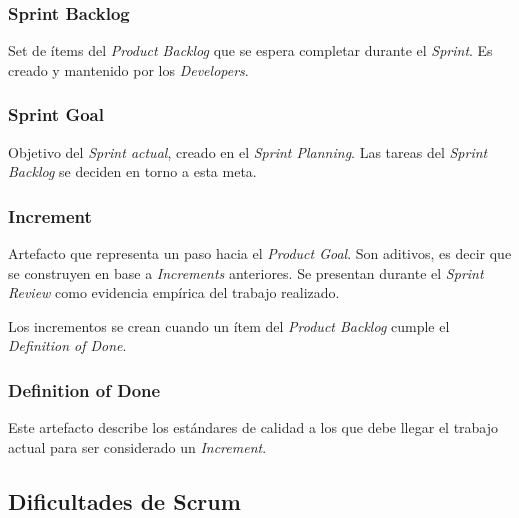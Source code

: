 \subsubsection{Sprint Backlog}
\par Set de ítems del \emph{Product Backlog} que se espera completar durante el \emph{Sprint}. Es creado y mantenido por los \emph{Developers}.
%
\subsubsection{Sprint Goal}
Objetivo del \emph{Sprint actual}, creado en el \emph{Sprint Planning}. Las tareas del \emph{Sprint Backlog} se deciden en torno a esta meta.
%
\subsubsection{Increment}
\par Artefacto que representa un paso hacia el \emph{Product Goal}. Son aditivos, es decir que se construyen en base a \emph{Increments} anteriores. Se presentan durante el \emph{Sprint Review} como evidencia empírica del trabajo realizado.
\par Los incrementos se crean cuando un ítem del \emph{Product Backlog} cumple el \emph{Definition of Done}.
%
\subsubsection{Definition of Done}
Este artefacto describe los estándares de calidad a los que debe llegar el trabajo actual para ser considerado un \emph{Increment}.
%
%
\subsection{Dificultades de Scrum}
